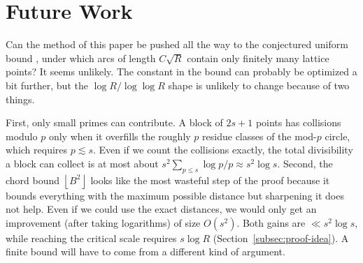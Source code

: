\documentclass[11pt]{article}
\newcommand{\T}{\mathbb T}
\newcommand{\floor}[1]{\left\lfloor #1 \right\rfloor}
\newcommand{\E}{\mathcal E}
\begin{document}

\section{Future Work}
\label{sec:future}

Can the method of this paper be pushed all the way to the conjectured uniform bound \cite{CillerueloGranville2007}, under which arcs of length \(C\sqrt R\) contain only finitely many lattice points?
It seems unlikely.
The constant in the bound can probably be optimized a bit further, but the $\log R / \log\log R$ shape is unlikely to change because of two things.

First, only small primes can contribute.
A block of \(2s+1\) points has collisions modulo \(p\) only when it overfills the roughly \(p\) residue classes of the mod-\(p\) circle, which requires \(p\lesssim s\).
Even if we count the collisions exactly, the total divisibility a block can collect is at most about \(s^2\sum_{p\le s}\log p/p\approx s^2\log s\).
Second, the chord bound \(\floor{B^2}\) looks like the most wasteful step of the proof because it bounds everything with the maximum possible distance but sharpening it does not help.
Even if we could use the exact distances, we would only get an improvement (after taking logarithms) of size $O(s^2)$.
Both gains are \(\ll s^2\log s\), while reaching the critical scale requires \(s\log R\) (Section~\ref{subsec:proof-idea}).
A finite bound will have to come from a different kind of argument.
\end{document}
